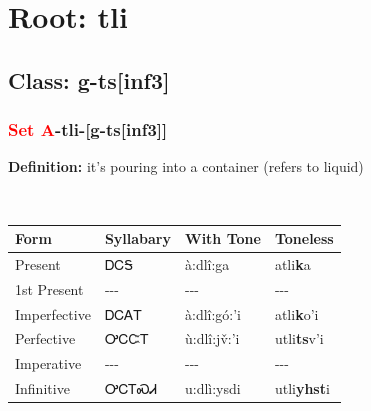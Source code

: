\needspace{4in}
\section*{Root: tli}
\nopagebreak
{}
\needspace{3in}
\subsection*{Class: g-ts[inf3]}
\nopagebreak
\needspace{2in}
\subsubsection*{\textcolor{Red}{Set A}{-}\textbf{tli}{-}[g-ts[inf3]]}
\nopagebreak
\textbf{Definition: } it{\textquoteright}s pouring into a container (refers to liquid)
\\[0.5em]
\begin{tabularx}{\textwidth}{l X X X}%
\toprule%
\textbf{Form}&\textbf{Syllabary}&\textbf{With Tone}&\textbf{Toneless}\\%
\midrule%
Present&ᎠᏟᎦ&à:dlî:ga&atli\textbf{k}a\\%
1st Present&{-}{-}{-}&{-}{-}{-}&{-}{-}{-}\\%
Imperfective&ᎠᏟᎪᎢ&à:dlî:gó:’i&atli\textbf{k}o'i\\%
Perfective&ᎤᏟᏨᎢ&ù:dlî:jv̌:’i&utli\textbf{ts}v'i\\%
Imperative&{-}{-}{-}&{-}{-}{-}&{-}{-}{-}\\%
Infinitive&ᎤᏟᎢᏍᏗ&u:dlì:ysdi&utli\textbf{yhst}i\\%
\bottomrule%
\end{tabularx}
\\[1em]
